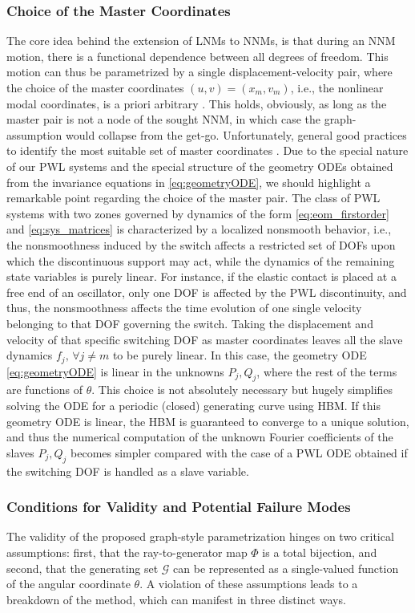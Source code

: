\documentclass[a4paper,9pt,parskip=half,english]{article}
\theoremstyle{plain}
\theoremstyle{definition}
\newcommand{\cG}{\mathcal{G}}
\begin{document}
\subsubsection{Choice of the Master Coordinates}
The core idea behind the extension of LNMs to NNMs, is that during an NNM motion, there is a functional dependence between all degrees of freedom. This motion can thus be parametrized by a single displacement-velocity pair, where the choice of the master coordinates $(u,v) = (x_m, v_m)$, i.e., the nonlinear modal coordinates, is a priori arbitrary \cite{Renson2013}. This holds, obviously, as long as the master pair is not a node of the sought NNM, in which case the graph-assumption would collapse from the get-go. Unfortunately, general good practices to identify the most suitable set of master coordinates \cite{Shaw2014}. Due to the special nature of our PWL systems and the special structure of the geometry ODEs obtained from the invariance equations in \eqref{eq:geometryODE}, we should highlight a remarkable point regarding the choice of the master pair. The class of PWL systems with two zones governed by dynamics of the form \eqref{eq:eom_firstorder} and \eqref{eq:sys_matrices} is characterized by a localized nonsmooth behavior, i.e., the nonsmoothness induced by the switch affects a restricted set of DOFs upon which the discontinuous support may act, while the dynamics of the remaining state variables is purely linear. For instance, if the elastic contact is placed at a free end of an oscillator, only one DOF is affected by the PWL discontinuity, and thus, the nonsmoothness affects the time evolution of one single velocity belonging to that DOF governing the switch. Taking the displacement and velocity of that specific switching DOF as master coordinates leaves all the slave dynamics $f_j,\, \forall j \neq m$ to be purely linear. In this case, the geometry ODE \eqref{eq:geometryODE} is linear in the unknowns $P_j,Q_j$, where the rest of the terms are functions of $\theta$. This choice is not absolutely necessary but hugely simplifies solving the ODE for a periodic (closed) generating curve using HBM. If this geometry ODE is linear, the HBM is guaranteed to converge to a unique solution, and thus the numerical computation of the unknown Fourier coefficients of the slaves $P_j,Q_j$ becomes simpler compared with the case of a PWL ODE obtained if the switching DOF is handled as a slave variable. 

\subsubsection{Conditions for Validity and Potential Failure Modes}\label{sec:cone_limitations}
The validity of the proposed graph-style parametrization hinges on two critical assumptions: first, that the ray-to-generator map $\Phi$ is a total bijection, and second, that the generating set $\cG$ can be represented as a single-valued function of the angular coordinate $\theta$. A violation of these assumptions leads to a breakdown of the method, which can manifest in three distinct ways. 
\end{document}
